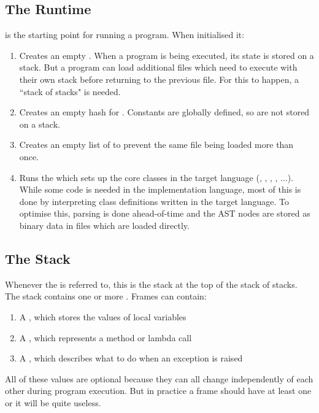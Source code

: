 \subsection{The Runtime}

 is the starting point for running a program. When initialised it:

\begin{enumerate}
  \item Creates an empty . When a program is being executed, its state is stored on a stack. But a program can load additional files which need to execute with their own stack before returning to the previous file. For this to happen, a ``stack of stacks" is needed.
  \item Creates an empty hash for . Constants are globally defined, so are not stored on a stack.
  \item Creates an empty list of  to prevent the same file being loaded more than once.
  \item Runs the  which sets up the core classes in the target language (, , , , ...). While some code is needed in the implementation language, most of this is done by interpreting class definitions written in the target language. To optimise this, parsing is done ahead-of-time and the AST nodes are stored as binary data in files which are loaded directly.
\end{enumerate}

\subsection{The Stack}

Whenever the  is referred to, this is the stack at the top of the stack of stacks. The stack contains one or more . Frames can contain:

\begin{enumerate}
  \item A , which stores the values of local variables
  \item A , which represents a method or lambda call
  \item A , which describes what to do when an exception is raised
\end{enumerate}

All of these values are optional because they can all change independently of each other during program execution. But in practice a frame should have at least one or it will be quite useless.

